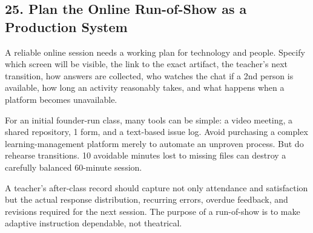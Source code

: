 \subsection*{25. Plan the Online Run-of-Show as a Production System}

A reliable online session needs a working plan for technology and people. Specify which screen will be visible, the link to the exact artifact, the teacher's next transition, how answers are collected, who watches the chat if a 2nd person is available, how long an activity reasonably takes, and what happens when a platform becomes unavailable.

For an initial founder-run class, many tools can be simple: a video meeting, a shared repository, 1 form, and a text-based issue log. Avoid purchasing a complex learning-management platform merely to automate an unproven process. But do rehearse transitions. 10 avoidable minutes lost to missing files can destroy a carefully balanced 60-minute session.

A teacher's after-class record should capture not only attendance and satisfaction but the actual response distribution, recurring errors, overdue feedback, and revisions required for the next session. The purpose of a run-of-show is to make adaptive instruction dependable, not theatrical.
